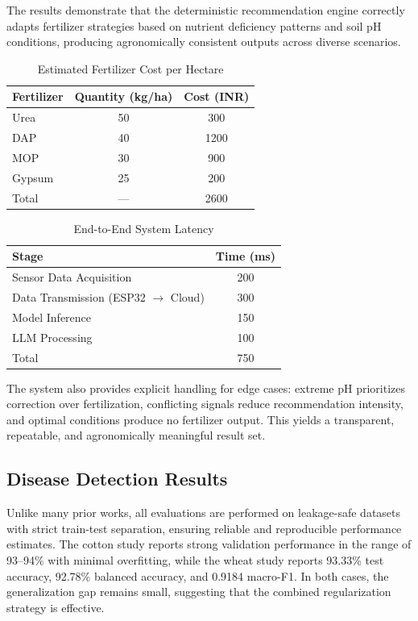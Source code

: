 \documentclass[conference]{IEEEtran}
\begin{document}
The results demonstrate that the deterministic recommendation engine correctly adapts fertilizer strategies based on nutrient deficiency patterns and soil pH conditions, producing agronomically consistent outputs across diverse scenarios.

\begin{table}[t]
\centering
\caption{Estimated Fertilizer Cost per Hectare}
\label{tab:cost-analysis}
\begin{tabular}{lcc}
\hline
Fertilizer & Quantity (kg/ha) & Cost (INR) \\
\hline
Urea & 50 & 300 \\
DAP & 40 & 1200 \\
MOP & 30 & 900 \\
Gypsum & 25 & 200 \\
\hline
Total & --- & 2600 \\
\hline
\end{tabular}
\end{table}

\begin{table}[t]
\centering
\caption{End-to-End System Latency}
\label{tab:latency}
\begin{tabular}{lc}
\hline
Stage & Time (ms) \\
\hline
Sensor Data Acquisition & 200 \\
Data Transmission (ESP32 $\rightarrow$ Cloud) & 300 \\
Model Inference & 150 \\
LLM Processing & 100 \\
\hline
Total & 750 \\
\hline
\end{tabular}
\end{table}

The system also provides explicit handling for edge cases: extreme pH prioritizes correction over fertilization, conflicting signals reduce recommendation intensity, and optimal conditions produce no fertilizer output. This yields a transparent, repeatable, and agronomically meaningful result set.

\subsection{Disease Detection Results}
Unlike many prior works, all evaluations are performed on leakage-safe datasets with strict train-test separation, ensuring reliable and reproducible performance estimates. The cotton study reports strong validation performance in the range of 93--94\% with minimal overfitting, while the wheat study reports 93.33\% test accuracy, 92.78\% balanced accuracy, and 0.9184 macro-F1. In both cases, the generalization gap remains small, suggesting that the combined regularization strategy is effective.
\end{document}
